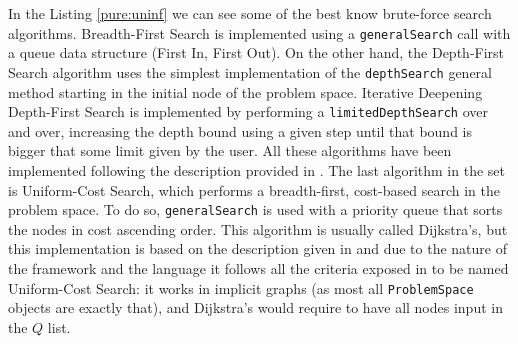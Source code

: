 In the Listing \ref{pure:uninf} we can see some of the best know brute-force
search algorithms. Breadth-First Search is implemented using a
\texttt{generalSearch} call with a queue data structure (First In, First Out).
On the other hand, the Depth-First Search algorithm uses the simplest
implementation of the \texttt{depthSearch} general method starting in the
initial node of the problem space. Iterative Deepening Depth-First Search is
implemented by performing a \texttt{limitedDepthSearch} over and over,
increasing the depth bound using a given step until that bound is bigger that
some limit given by the user. All these algorithms have been implemented
following the description provided in \cite{rusell-2003-aima}. The last
algorithm in the set is Uniform-Cost Search, which performs a breadth-first,
cost-based search in the problem space. To do so, \texttt{generalSearch} is
used with a priority queue that sorts the nodes in cost ascending order. This
algorithm is usually called Dijkstra's, but this implementation is based on the
description given in \cite{rusell-2003-aima} and due to the nature of the
framework and the language it follows all the criteria exposed in
\cite{felner-2011-dijkstra} to be named Uniform-Cost Search: it works in
implicit graphs (as most all \texttt{ProblemSpace} objects are exactly that),
and Dijkstra's would require to have all nodes input in the $Q$ list.

\newpage

